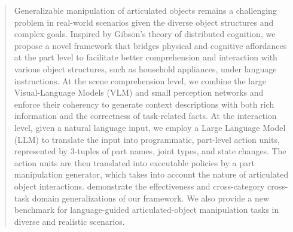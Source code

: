\begin{abstract}

Generalizable manipulation of articulated objects remains a challenging problem in real-world scenarios given the diverse object structures and complex goals.
%
Inspired by Gibson's theory of distributed cognition, we propose a novel framework that bridges physical and cognitive affordances at the part level to facilitate better comprehension and interaction with various object structures, such as household appliances, under language instructions.
%
At the scene comprehension level, we combine the large Visual-Language Models (VLM) and small perception networks and enforce their coherency to generate context descriptions with both rich information and the correctness of task-related facts.
%
At the interaction level, given a natural language input, we employ a Large Language Model (LLM) to translate the input into programmatic, part-level action units, represented by 3-tuples of part names, joint types, and state changes.
The action units are then translated into executable policies by a part manipulation generator, which takes into account the nature of articulated object interactions.
%
 demonstrate the effectiveness and cross-category cross-task domain generalizations of our framework. We also provide a new benchmark for language-guided articulated-object manipulation tasks in diverse and realistic scenarios.

\end{abstract}